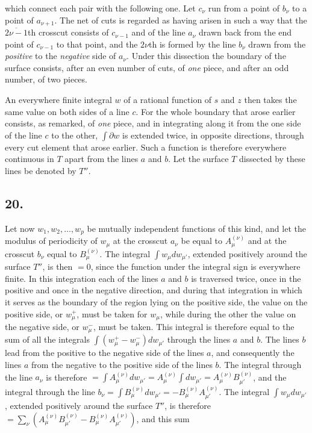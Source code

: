 \documentclass{article}
\begin{document}
which connect each pair with the following one. Let $c_{\nu}$ run from a point of $b_{\nu}$ to a point of $a_{\nu+1}$. The net of cuts is regarded as having arisen in such a way that the $\overline{2\nu-1}$th crosscut consists of $c_{\nu-1}$ and of the line $a_{\nu}$ drawn back from the end point of $c_{\nu-1}$ to that point, and the $2\nu$th is formed by the line $b_{\nu}$ drawn from the \emph{positive} to the \emph{negative} side of $a_{\nu}$. Under this dissection the boundary of the surface consists, after an even number of cuts, of \emph{one} piece, and after an odd number, of two pieces.

An everywhere finite integral $w$ of a rational function of $s$ and $z$ then takes the same value on both sides of a line $c$. For the whole boundary that arose earlier consists, as remarked, of \emph{one} piece, and in integrating along it from the one side of the line $c$ to the other, $\displaystyle\int \partial w$ is extended twice, in opposite directions, through every cut element that arose earlier. Such a function is therefore everywhere continuous in $T$ apart from the lines $a$ and $b$. Let the surface $T$ dissected by these lines be denoted by $T''$.

\subsection*{20.}

Let now $w_{1}, w_{2}, \ldots, w_{p}$ be mutually independent functions of this kind, and let the modulus of periodicity of $w_{\mu}$ at the crosscut $a_{\nu}$ be equal to $A_{\mu}^{(\nu)}$ and at the crosscut $b_{\nu}$ equal to $B_{\mu}^{(\nu)}$. The integral $\displaystyle\int w_{\mu} dw_{\mu'}$, extended positively around the surface $T''$, is then $= 0$, since the function under the integral sign is everywhere finite. In this integration each of the lines $a$ and $b$ is traversed twice, once in the positive and once in the negative direction, and during that integration in which it serves as the boundary of the region lying on the positive side, the value on the positive side, or $w_{\mu}^{+}$, must be taken for $w_{\mu}$, while during the other the value on the negative side, or $w_{\mu}^{-}$, must be taken. This integral is therefore equal to the sum of all the integrals $\displaystyle\int (w_{\mu}^{+} - w_{\mu}^{-}) dw_{\mu'}$ through the lines $a$ and $b$. The lines $b$ lead from the positive to the negative side of the lines $a$, and consequently the lines $a$ from the negative to the positive side of the lines $b$. The integral through the line $a_{\nu}$ is therefore $= \displaystyle\int A_{\mu}^{(\nu)} dw_{\mu'} = A_{\mu}^{(\nu)} \int dw_{\mu'} = A_{\mu}^{(\nu)} B_{\mu'}^{(\nu)}$, and the integral through the line $b_{\nu} = \displaystyle\int B_{\mu}^{(\nu)} dw_{\mu'} = -B_{\mu}^{(\nu)} A_{\mu'}^{(\nu)}$. The integral $\displaystyle\int w_{\mu} dw_{\mu'}$, extended positively around the surface $T''$, is therefore $= \displaystyle\sum_{\nu} \left(A_{\mu}^{(\nu)} B_{\mu'}^{(\nu)} - B_{\mu}^{(\nu)} A_{\mu'}^{(\nu)}\right)$, and this sum
\end{document}
